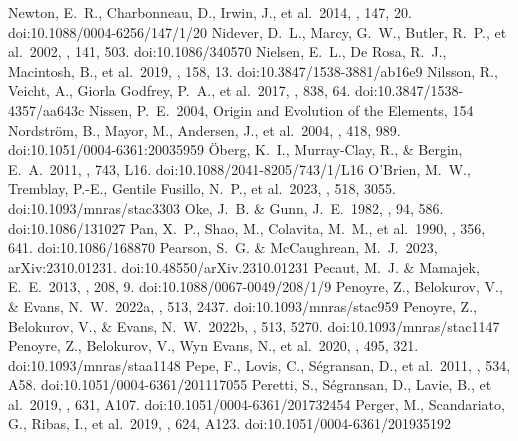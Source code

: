 \documentclass[twocolumn,tighten,twocolappendix]{aastex631}
\begin{document}
\begin{thebibliography}{}
 Newton, E.~R., Charbonneau, D., Irwin, J., et al.\ 2014, \aj, 147, 20. doi:10.1088/0004-6256/147/1/20
 Nidever, D.~L., Marcy, G.~W., Butler, R.~P., et al.\ 2002, \apjs, 141, 503. doi:10.1086/340570
 Nielsen, E.~L., De Rosa, R.~J., Macintosh, B., et al.\ 2019, \aj, 158, 13. doi:10.3847/1538-3881/ab16e9
 Nilsson, R., Veicht, A., Giorla Godfrey, P.~A., et al.\ 2017, \apj, 838, 64. doi:10.3847/1538-4357/aa643c
 Nissen, P.~E.\ 2004, Origin and Evolution of the Elements, 154
 Nordstr{\"o}m, B., Mayor, M., Andersen, J., et al.\ 2004, \aap, 418, 989. doi:10.1051/0004-6361:20035959
 {\"O}berg, K.~I., Murray-Clay, R., \& Bergin, E.~A.\ 2011, \apjl, 743, L16. doi:10.1088/2041-8205/743/1/L16
 O'Brien, M.~W., Tremblay, P.-E., Gentile Fusillo, N.~P., et al.\ 2023, \mnras, 518, 3055. doi:10.1093/mnras/stac3303
 Oke, J.~B. \& Gunn, J.~E.\ 1982, \pasp, 94, 586. doi:10.1086/131027
 Pan, X.~P., Shao, M., Colavita, M.~M., et al.\ 1990, \apj, 356, 641. doi:10.1086/168870
 Pearson, S.~G. \& McCaughrean, M.~J.\ 2023, arXiv:2310.01231. doi:10.48550/arXiv.2310.01231
 Pecaut, M.~J. \& Mamajek, E.~E.\ 2013, \apjs, 208, 9. doi:10.1088/0067-0049/208/1/9
 Penoyre, Z., Belokurov, V., \& Evans, N.~W.\ 2022a, \mnras, 513, 2437. doi:10.1093/mnras/stac959
 Penoyre, Z., Belokurov, V., \& Evans, N.~W.\ 2022b, \mnras, 513, 5270. doi:10.1093/mnras/stac1147
 Penoyre, Z., Belokurov, V., Wyn Evans, N., et al.\ 2020, \mnras, 495, 321. doi:10.1093/mnras/staa1148
 Pepe, F., Lovis, C., S{\'e}gransan, D., et al.\ 2011, \aap, 534, A58. doi:10.1051/0004-6361/201117055
 Peretti, S., S{\'e}gransan, D., Lavie, B., et al.\ 2019, \aap, 631, A107. doi:10.1051/0004-6361/201732454
 Perger, M., Scandariato, G., Ribas, I., et al.\ 2019, \aap, 624, A123. doi:10.1051/0004-6361/201935192

\end{thebibliography}
\end{document}
